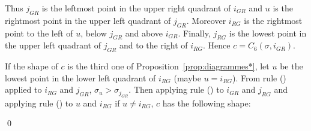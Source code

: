 \documentclass[11pt]{article}
\newenvironment{pf}{{\em \noindent Proof:}}{ \hfill \qed\smallskip}
\newcommand{\rmnum}[1]{\romannumeral #1}
\newcommand{\Vpoint}[2]{\draw (#1,#2) [darkgreen,fill=darkgreen] circle (3pt);}
\newcommand{\Hpoint}[2]{\draw (#1,#2) [darkred,fill=darkred] circle (3pt);}
\newcommand{\zoneRG}[3]{
\draw [very thick,H,Hpoint] (#1,#2) -- +(-#3,0);
\draw [very thick,V,Vpoint] (#1,#2) -- +(0,#3);
\draw [Hfill] (#1,#2) -- +(-#3,#3) -- +(-#3,0);
\draw [Vfill] (#1,#2) -- +(-#3,#3) -- + (0,#3);
}
\newcommand{\zoneGR}[3]{
\draw [very thick,H,Hpoint] (#1,#2) -- +(-#3,0);
\draw [very thick,V,Vpoint] (#1,#2) -- +(0,#3);
\draw [Vfill] (#1,#2) -- +(-#3,#3) -- +(-#3,0);
\draw [Hfill] (#1,#2) -- +(-#3,#3) -- + (0,#3);
}
\begin{document}
\begin{pf}
\begin{minipage}{.2\textwidth}
\end{minipage}
\begin{minipage}{.75\textwidth}
Thus $j_{GR}$ is the leftmost point in the upper right quadrant of $i_{GR}$ and
$u$ is the rightmost point in the upper left quadrant of $j_{GR}$.
Moreover $i_{RG}$ is the rightmost point to the left of $u$, below $j_{GR}$ and above $i_{GR}$. 
Finally, $j_{RG}$ is the lowest point in the upper left quadrant of $j_{GR}$ and to the right of $i_{RG}$. 
Hence $c = C_6(\sigma, i_{GR})$.
\end{minipage}

If the shape of $c$ is the third one of Proposition~\ref{prop:diagrammes*}, 
let $u$ be the lowest point in the lower left quadrant of $i_{RG}$ (maybe $u = i_{RG}$).
From rule (\rmnum{7}) applied to $i_{RG}$ and $j_{GR}$, $\sigma_u > \sigma_{j_{GR}}$.
Then applying rule (\rmnum{1}) to $i_{GR}$ and $j_{RG}$ 
and applying rule (\rmnum{2}) to $u$ and $i_{RG}$ if $u \neq i_{RG}$, $c$ has the following shape: 


\end{pf}
\end{document}
